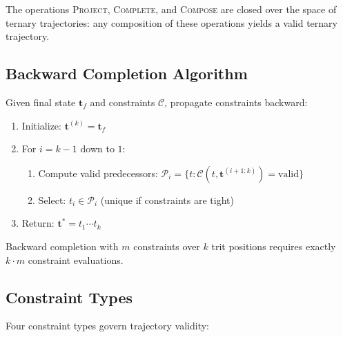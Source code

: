 \begin{proposition}[Closure]
The operations \textsc{Project}, \textsc{Complete}, and \textsc{Compose} are closed over the space of ternary trajectories: any composition of these operations yields a valid ternary trajectory.
\end{proposition}

\subsection{Backward Completion Algorithm}

\begin{definition}
\label{def:backward_completion}
Given final state $\mathbf{t}_f$ and constraints $\mathcal{C}$, propagate constraints backward:
\begin{enumerate}
\item Initialize: $\mathbf{t}^{(k)} = \mathbf{t}_f$
\item For $i = k-1$ down to $1$:
\begin{enumerate}
\item Compute valid predecessors: $\mathcal{P}_i = \{t : \mathcal{C}(t, \mathbf{t}^{(i+1:k)}) = \text{valid}\}$
\item Select: $t_i \in \mathcal{P}_i$ (unique if constraints are tight)
\end{enumerate}
\item Return: $\mathbf{t}^* = t_1 \cdots t_k$
\end{enumerate}
\end{definition}

\begin{theorem}
Backward completion with $m$ constraints over $k$ trit positions requires exactly $k \cdot m$ constraint evaluations.
\end{theorem}

\subsection{Constraint Types}

Four constraint types govern trajectory validity:

